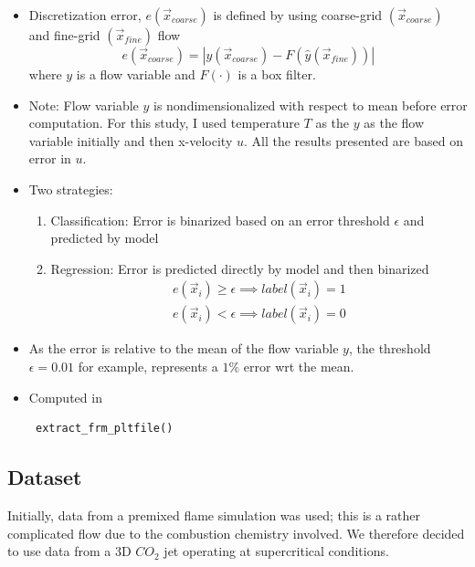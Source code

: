 \documentclass{article}
\begin{document}
	\begin{itemize}
		\item Discretization error, $e(\vec{x}_{coarse})$ is defined by using coarse-grid $(\vec{x}_{coarse})$ and fine-grid $(\vec{x}_{fine})$ flow \\
		
		\begin{equation*}
			e(\vec{x}_{coarse}) = |y(\vec{x}_{coarse}) - F(\hat{y}(\vec{x}_{fine}))|
		\end{equation*}
	where $y$ is a flow variable and $F(\cdot)$ is a box filter.  
	\item Note: Flow variable $y$ is nondimensionalized with respect to mean before error computation. 
	For this study, I used temperature $T$ as the $y$ as the flow variable initially and then x-velocity $u$. All the results presented are based on error in $u$.
	\item Two strategies:
	\begin{enumerate}
	\item Classification: Error is binarized based on an error threshold $\epsilon$ and predicted by model
	\item Regression: Error is predicted directly by model and then binarized 
	\begin{align*}
		e(\vec{x}_i) \ge  \epsilon \implies label(\vec{x}_i) = 1 \\
		e(\vec{x}_i) <     \epsilon \implies label(\vec{x}_i) = 0
	\end{align*}
   \end{enumerate}
   \item As the error is relative to the mean of the flow variable $y$, the threshold $\epsilon = 0.01$ for example, represents a $1\%$ error wrt the mean.
   \item Computed in \begin{verbatim} extract_frm_pltfile() \end{verbatim}
	\end{itemize}

\subsection{Dataset}

Initially, data from a premixed flame simulation was used; this is a rather complicated flow due to the combustion chemistry involved. We therefore decided to use data from a  3D $CO_2$ jet operating at supercritical conditions. 
\end{document}
